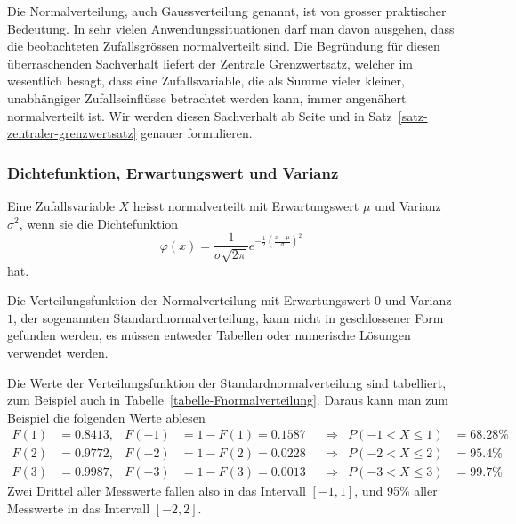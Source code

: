 Die Normalverteilung, auch Gaussverteilung genannt, ist von grosser praktischer
Bedeutung.
In sehr vielen Anwendungssituationen darf man davon ausgehen,
dass die beobachteten Zufallsgrössen normalverteilt sind.
Die Begründung
für diesen überraschenden Sachverhalt liefert der Zentrale Grenzwertsatz,
welcher im wesentlich besagt, dass eine Zufallsvariable, die als Summe vieler
kleiner, unabhängiger Zufallseinflüsse betrachtet werden kann, immer
angenähert normalverteilt ist.
Wir werden diesen Sachverhalt ab Seite \pageref{zentraler-grenzwertsatz}
und in Satz~\ref{satz-zentraler-grenzwertsatz} genauer formulieren.

\subsubsection{Dichtefunktion, Erwartungswert und Varianz}
\begin{definition}
Eine Zufallsvariable $X$ heisst normalverteilt mit Erwartungswert $\mu$ und
Varianz $\sigma^2$, wenn sie die
Dichtefunktion
\[
\varphi(x)=\frac1{\sigma\sqrt{2\pi}}e^{-\frac{1}{2}
\left(\frac{x-\mu}{\sigma}\right)^2}
\]
hat.
\end{definition}
%
%
Die Verteilungsfunktion der Normalverteilung mit Erwartungswert $0$
und Varianz $1$, der sogenannten Standardnormalverteilung, kann nicht in
geschlossener Form gefunden werden, es müssen entweder Tabellen
oder numerische Lösungen verwendet werden.

Die Werte der Verteilungsfunktion der Standardnormalverteilung sind 
tabelliert, zum Beispiel auch in Tabelle~\ref{tabelle-Fnormalverteilung}.
Daraus kann man zum Beispiel die folgenden Werte ablesen
\begin{align*}
F(1)&=0.8413,&F(-1)&=1-F(1)=0.1587&&\Rightarrow&P(-1<X\le 1)&=68.28\%\\
F(2)&=0.9772,&F(-2)&=1-F(2)=0.0228&&\Rightarrow&P(-2<X\le 2)&=95.4\%\\
F(3)&=0.9987,&F(-3)&=1-F(3)=0.0013&&\Rightarrow&P(-3<X\le 3)&=99.7\%
\end{align*}
Zwei Drittel aller Messwerte fallen also in das Intervall $[-1,1]$, und 95\%
aller Messwerte in das Intervall $[-2,2]$.

